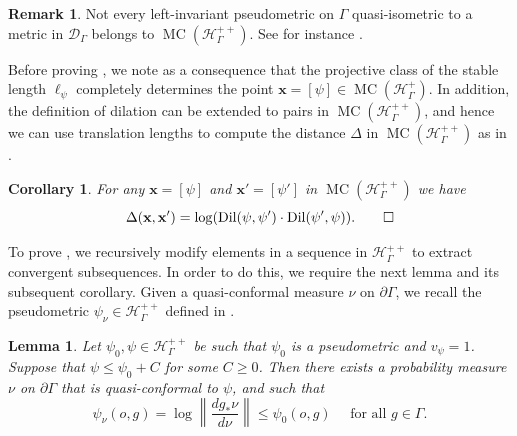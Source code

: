 \documentclass[twoside]{amsart}
\newtheorem{corollary}[theorem]{Corollary}
\newtheorem{lemma}[theorem]{Lemma}
\theoremstyle{definition}
\newtheorem{remark}[theorem]{Remark}
\numberwithin{equation}{section}
\numberwithin{theorem}{section}
\newcommand{\calD}{\mathcal{D}}
\newcommand{\calH}{\mathcal{H}}
\newcommand{\scrH}{\mathscr{H}}
\newcommand{\G}{\Gamma}
\newcommand{\Del}{\Delta}
\newcommand{\n}{\nu}
\newcommand{\p}{\psi}
\DeclareMathOperator{\Dil}{Dil}
\newcommand{\vx}{\mathbf{x}}
\DeclareMathOperator{\MC}{MC}
\newcommand{\pG}{\partial \G}
\begin{document}
\begin{remark}\label{rmk:badmetrics}
Not every left-invariant pseudometric on $\G$ quasi-isometric to a metric in $\calD_\G$ belongs to $\MC(\calH_\G^{++})$. See for instance .
\end{remark}


Before proving , we note as a consequence that the projective class of the stable length $\ell_{\p}$ completely determines the point $\vx=[\p] \in \MC(\scrH_\Gamma^{+})$. In addition, the definition of dilation can be extended to pairs in $\MC(\calH_\G^{++})$, and hence we can use translation lengths to compute the distance $\Del$ in $\MC(\scrH_\G^{++})$ as in .

\begin{corollary}\label{cor:DeltaformulaMC}
For any $\vx=[\p]$ and $\vx'=[\p']$ in $\MC(\scrH_\G^{++})$ we have 
\[\Del(\vx,\vx')=\log(\Dil(\p,\p')\cdot \Dil(\p',\p)). \qedhere\]
\end{corollary}

To prove , we recursively modify elements in a sequence in $\calH_\G^{++}$ to extract convergent subsequences. In order to do this, we require the next lemma and its subsequent corollary. Given a quasi-conformal measure $\nu$ on $\partial \G$, we recall the pseudometric $\p_\n\in \calH_\G^{++}$ defined in .

\begin{lemma}\label{lem:improvemeasure}
Let $\p_0,\p\in \calH_\G^{++}$ be such that $\p_0$ is a pseudometric and $v_\p=1$. 
    Suppose that $\p\leq \p_0+C$ for some $C\geq 0$. Then there exists a probability measure $\nu$ on $\pG$ that is quasi-conformal to $\p$, and such that  
$$\p_\nu(o,g)=\log\left\|\frac{dg_\ast\nu}{d\nu}\right\|\leq \p_0(o,g) \quad \text{ for all }g\in \G.$$
\end{lemma}
\end{document}
